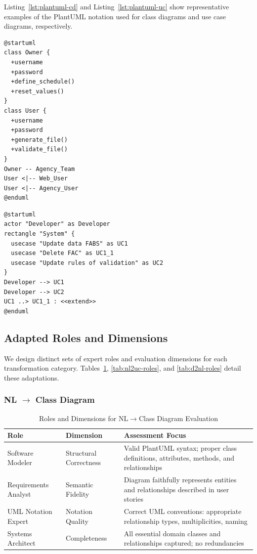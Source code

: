 \documentclass[lettersize,journal]{IEEEtran}
\begin{document}
Listing~\ref{lst:plantuml-cd} and Listing~\ref{lst:plantuml-uc} show representative examples of the PlantUML notation used for class diagrams and use case diagrams, respectively.

\begin{lstlisting}[caption={Example PlantUML class diagram (US1).},label={lst:plantuml-cd},language={}]
@startuml
class Owner {
  +username
  +password
  +define_schedule()
  +reset_values()
}
class User {
  +username
  +password
  +generate_file()
  +validate_file()
}
Owner -- Agency_Team
User <|-- Web_User
User <|-- Agency_User
@enduml
\end{lstlisting}

\begin{lstlisting}[caption={Example PlantUML use case diagram (US1, excerpt).},label={lst:plantuml-uc},language={}]
@startuml
actor "Developer" as Developer
rectangle "System" {
  usecase "Update data FABS" as UC1
  usecase "Delete FAC" as UC1_1
  usecase "Update rules of validation" as UC2
}
Developer --> UC1
Developer --> UC2
UC1 ..> UC1_1 : <<extend>>
@enduml
\end{lstlisting}

\subsection{Adapted Roles and Dimensions}
\label{sec:roles}

We design distinct sets of expert roles and evaluation dimensions for each transformation category. Tables~\ref{tab:nl2cd-roles}, \ref{tab:nl2uc-roles}, and \ref{tab:d2nl-roles} detail these adaptations.

\subsubsection{NL $\rightarrow$ Class Diagram}

\begin{table}[!t]
\centering
\caption{Roles and Dimensions for NL$\rightarrow$Class Diagram Evaluation}
\label{tab:nl2cd-roles}
\begin{tabular}{@{}p{2cm}p{1.8cm}p{3.7cm}@{}}
\toprule
\textbf{Role} & \textbf{Dimension} & \textbf{Assessment Focus} \\
\midrule
Software Modeler & Structural Correctness & Valid PlantUML syntax; proper class definitions, attributes, methods, and relationships \\
\addlinespace
Requirements Analyst & Semantic Fidelity & Diagram faithfully represents entities and relationships described in user stories \\
\addlinespace
UML Notation Expert & Notation Quality & Correct UML conventions: appropriate relationship types, multiplicities, naming \\
\addlinespace
Systems Architect & Completeness & All essential domain classes and relationships captured; no redundancies \\
\bottomrule
\end{tabular}
\end{table}
\end{document}

